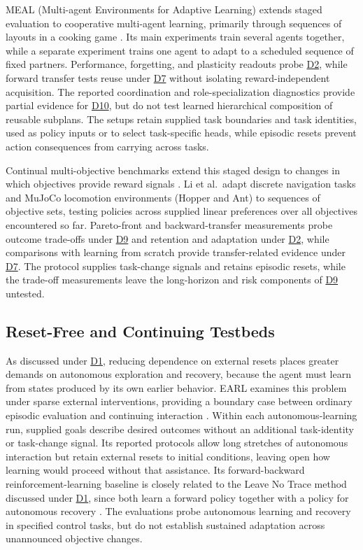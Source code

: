 \documentclass[10pt,journal,compsoc]{IEEEtran}
\DeclareRobustCommand{\Dref}[1]{\hyperref[sec:d#1]{D#1}}
\begin{document}
MEAL (Multi-agent Environments for Adaptive Learning) extends staged evaluation to cooperative multi-agent learning, primarily through sequences of layouts in a cooking game \cite{tomilin2026}.
Its main experiments train several agents together, while a separate experiment trains one agent to adapt to a scheduled sequence of fixed partners.
Performance, forgetting, and plasticity readouts probe \Dref{2}, while forward transfer tests reuse under \Dref{7} without isolating reward-independent acquisition.
The reported coordination and role-specialization diagnostics provide partial evidence for \Dref{10}, but do not test learned hierarchical composition of reusable subplans.
The setups retain supplied task boundaries and task identities, used as policy inputs or to select task-specific heads, while episodic resets prevent action consequences from carrying across tasks.

Continual multi-objective benchmarks extend this staged design to changes in which objectives provide reward signals \cite{li2024a}.
Li et al.\ adapt discrete navigation tasks and MuJoCo locomotion environments (Hopper and Ant) to sequences of objective sets, testing policies across supplied linear preferences over all objectives encountered so far.
Pareto-front and backward-transfer measurements probe outcome trade-offs under \Dref{9} and retention and adaptation under \Dref{2}, while comparisons with learning from scratch provide transfer-related evidence under \Dref{7}.
The protocol supplies task-change signals and retains episodic resets, while the trade-off measurements leave the long-horizon and risk components of \Dref{9} untested.

\subsection{Reset-Free and Continuing Testbeds}
\label{sec:landscape-continuing}

As discussed under \Dref{1}, reducing dependence on external resets places greater demands on autonomous exploration and recovery, because the agent must learn from states produced by its own earlier behavior.
EARL examines this problem under sparse external interventions, providing a boundary case between ordinary episodic evaluation and continuing interaction \cite{sharma2022}.
Within each autonomous-learning run, supplied goals describe desired outcomes without an additional task-identity or task-change signal.
Its reported protocols allow long stretches of autonomous interaction but retain external resets to initial conditions, leaving open how learning would proceed without that assistance.
Its forward-backward reinforcement-learning baseline is closely related to the Leave No Trace method discussed under \Dref{1}, since both learn a forward policy together with a policy for autonomous recovery \cite{eysenbach2018,sharma2022}.
The evaluations probe autonomous learning and recovery in specified control tasks, but do not establish sustained adaptation across unannounced objective changes.
\end{document}
